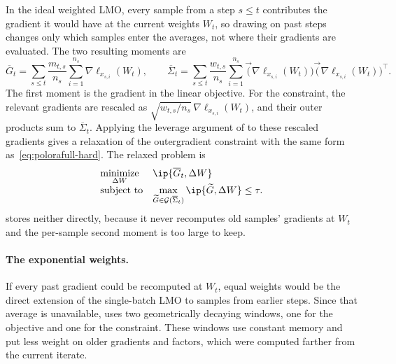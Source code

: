 In the ideal weighted LMO, every sample from a step $s\le t$ contributes
the gradient it would have at the current weights $W_t$, so drawing on past
steps changes only which samples enter the averages, not where their
gradients are evaluated. The two resulting moments are
\[
\overline G_t
  =
  \sum_{s\le t}\frac{m_{t,s}}{n_s}\sum_{i=1}^{n_s}
  \nabla\ell_{x_{s,i}}(W_t),
\qquad
\overline\Sigma_t
  =
  \sum_{s\le t}\frac{w_{t,s}}{n_s}\sum_{i=1}^{n_s}
  \vec(\nabla\ell_{x_{s,i}}(W_t))
  \vec(\nabla\ell_{x_{s,i}}(W_t))^\top .
\]
The first moment is the gradient in the linear objective. For the
constraint, the relevant gradients are rescaled as
$\sqrt{w_{t,s}/n_s}\,\nabla\ell_{x_{s,i}}(W_t)$, and their outer
products sum to $\overline\Sigma_t$. Applying the leverage argument of
 to these rescaled gradients gives a relaxation of
the outergradient constraint with the same form
as~\eqref{eq:polorafull-hard}. The relaxed problem is
\begin{equation}\label{eq:weighted-relaxed-k9}
 \begin{array}{ll}
  \underset{\Delta W}{\mathrm{minimize}} &
  \ip{\overline G_t, \Delta W} \\[2pt]
  \mbox{subject to} &
  \displaystyle
  \max_{\widetilde{G}\in\mathcal{G}(\overline\Sigma_t)}
  \ip{\widetilde{G},\Delta W}\le\tau .
  \end{array}
\end{equation}
 stores neither directly, because it never recomputes old
samples' gradients at $W_t$ and the per-sample second moment is too large
to keep.

\paragraph{The exponential weights.}
If every past gradient could be recomputed at $W_t$, equal weights would be
the direct extension of the single-batch LMO to samples from earlier steps.
Since that average is unavailable,  uses two geometrically decaying windows,
one for the objective and one for the constraint. These windows use
constant memory and put less weight on older gradients and factors, which
were computed farther from the current iterate.

